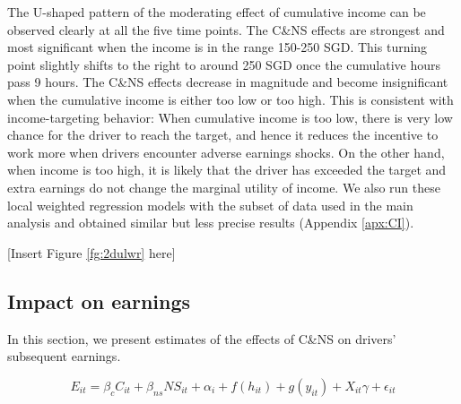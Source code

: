 \documentclass[reviewmode,AEJ]{AEA}
\begin{document}
The U-shaped pattern of the moderating effect of cumulative income can be observed clearly at all the five time points. The C\&NS effects are strongest and most significant when the income is in the range 150-250 SGD. This turning point slightly shifts to the right to around 250 SGD once the cumulative hours pass 9 hours. The C\&NS effects decrease in magnitude and become insignificant when the cumulative income is either too low or too high. This is consistent with income-targeting behavior: When cumulative income is too low, there is very low chance for the driver to reach the target, and hence it reduces the incentive to work more when drivers encounter adverse earnings shocks. On the other hand, when income is too high, it is likely that the driver has exceeded the target and extra earnings do not change the marginal utility of income. We also run these local weighted regression models with the subset of data used in the main analysis and obtained similar but less precise results (Appendix \ref{apx:CI}).


\begin{center}
	[Insert Figure \ref{fg:2dulwr} here]
\end{center}

\subsection{Impact on earnings}
In this section, we present estimates of the effects of C\&NS on drivers' subsequent earnings.

\begin{equation}
\label{eq:outcomes}
E_{it} = \beta_c C_{it} + \beta_{ns} {NS}_{it} + \alpha_i + f(h_{it}) + g(y_{it}) + X_{it}\gamma  + \epsilon_{it}
\end{equation}
\end{document}
